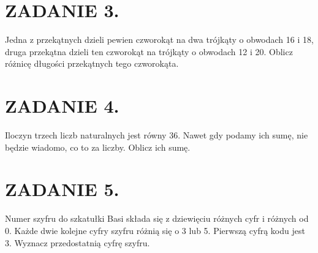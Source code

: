 \documentclass[10pt]{article}
\begin{document}
\section*{ZADANIE 3.}
Jedna z przekątnych dzieli pewien czworokąt na dwa trójkąty o obwodach 16 i 18, druga przekątna dzieli ten czworokąt na trójkąty o obwodach 12 i 20. Oblicz różnicę długości przekątnych tego czworokąta.

\section*{ZADANIE 4.}
Iloczyn trzech liczb naturalnych jest równy 36. Nawet gdy podamy ich sumę, nie będzie wiadomo, co to za liczby. Oblicz ich sumę.

\section*{ZADANIE 5.}
Numer szyfru do szkatułki Basi składa się z dziewięciu różnych cyfr i różnych od 0. Każde dwie kolejne cyfry szyfru różnią się o 3 lub 5. Pierwszą cyfrą kodu jest 3. Wyznacz przedostatnią cyfrę szyfru.
\end{document}
